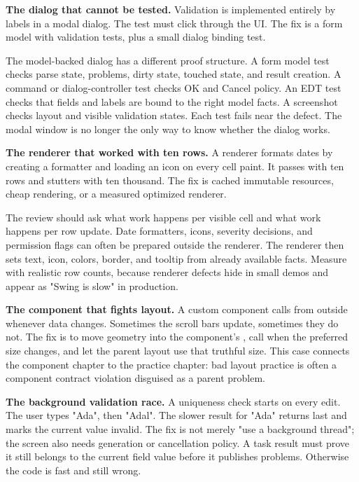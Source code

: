 \textbf{The dialog that cannot be tested.}
Validation is implemented entirely by labels in a modal dialog. The test must click through the UI. The fix is a form model with validation tests, plus a small dialog binding test.

The model-backed dialog has a different proof structure. A form model test
checks parse state, problems, dirty state, touched state, and result creation.
A command or dialog-controller test checks OK and Cancel policy. An EDT test
checks that fields and labels are bound to the right model facts. A screenshot
checks layout and visible validation states. Each test fails near the defect.
The modal window is no longer the only way to know whether the dialog works.

\textbf{The renderer that worked with ten rows.}
A renderer formats dates by creating a formatter and loading an icon on every cell paint. It passes with ten rows and stutters with ten thousand. The fix is cached immutable resources, cheap rendering, or a measured optimized renderer.

The review should ask what work happens per visible cell and what work happens
per row update. Date formatters, icons, severity decisions, and permission flags
can often be prepared outside the renderer. The renderer then sets text, icon,
colors, border, and tooltip from already available facts. Measure with
realistic row counts, because renderer defects hide in small demos and appear
as "Swing is slow" in production.

\textbf{The component that fights layout.}
A custom component calls  from outside whenever data
changes. Sometimes the scroll bars update, sometimes they do not. The fix is to
move geometry into the component's , call
 when the preferred size changes, and let the parent layout use
that truthful size. This case connects the component chapter to the practice
chapter: bad layout practice is often a component contract violation disguised
as a parent problem.

\textbf{The background validation race.}
A uniqueness check starts on every edit. The user types "Ada", then "Adal".
The slower result for "Ada" returns last and marks the current value invalid.
The fix is not merely "use a background thread"; the screen also needs
generation or cancellation policy. A task result must prove it still belongs to
the current field value before it publishes problems. Otherwise the code is
fast and still wrong.

